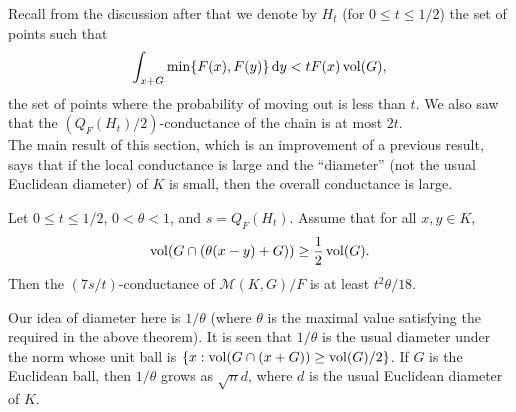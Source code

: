 Recall from the discussion after  that we denote by $H_t$ (for $0\leq t\leq 1/2$) the set of points such that
\[ \int_{x+G} \min\{F(x),F(y)\}\operatorname{d}\!{y} < tF(x)\operatorname{vol}(G), \]
the set of points where the probability of moving out is less than $t$.
We also saw that the $(Q_F(H_t)/2)$-conductance of the chain is at most $2t$.\\

The main result of this section, which is an improvement of a previous result, says that if the local conductance is large and the ``diameter'' (not the usual Euclidean diameter) of $K$ is small, then the overall conductance is large.

\begin{ftheo}
	\label{ftheo to bound conductance}
	Let $0\leq t\leq 1/2$, $0<\theta<1$, and $s=Q_F(H_t)$. Assume that for all $x,y\in K$,
	\begin{equation}
		\label{theo 4.40 eqn main}
		 \operatorname{vol}(G\cap (\theta(x-y)+G)) \geq \frac{1}{2}\operatorname{vol}(G).
	\end{equation}
	Then the $(7s/t)$-conductance of $\mathcal{M}(K,G)/F$ is at least $t^2\theta/18$.
\end{ftheo}

Our idea of diameter here is $1/\theta$ (where $\theta$ is the maximal value satisfying the required in the above theorem). It is seen that $1/\theta$ is the usual diameter under the norm whose unit ball is $\{x : \operatorname{vol}(G\cap(x+G))\geq\operatorname{vol}(G)/2\}$. If $G$ is the Euclidean ball, then $1/\theta$ grows as $\sqrt{n}d$, where $d$ is the usual Euclidean diameter of $K$.

